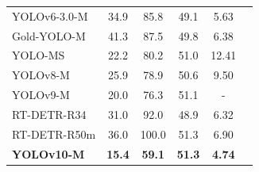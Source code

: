 \documentclass[12pt,oneside]{book} %
\begin{document}
\begin{table}[H]
\begin{adjustbox}{max width=0.75\textwidth}
\begin{tabular}{lccccc}
            \midrule
            YOLOv6-3.0-M       & 34.9                & 85.8               & 49.1                                & 5.63                  \\  
            Gold-YOLO-M        & 41.3                & 87.5               & 49.8                                & 6.38                  \\  
            YOLO-MS            & 22.2                & 80.2               & 51.0                                & 12.41                 \\  
            YOLOv8-M           & 25.9                & 78.9               & 50.6                                & 9.50                  \\  
            YOLOv9-M           & 20.0                & 76.3               & 51.1                                & -                     \\  
            RT-DETR-R34        & 31.0                & 92.0               & 48.9                                & 6.32                  \\  
            RT-DETR-R50m       & 36.0                & 100.0              & 51.3                                & 6.90                  \\  
            \textbf{YOLOv10-M} & \textbf{15.4}       & \textbf{59.1}      & \textbf{51.3}                       & \textbf{4.74}         \\  
            \bottomrule
        \end{tabular}
    \end{adjustbox}
    \label{tab:yolov10-benchmarks}
\end{table}
\end{document}
